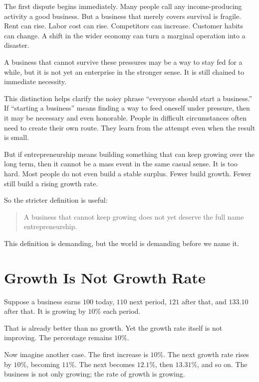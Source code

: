 The first dispute begins immediately. Many people call any income-producing activity a good business. But a business that merely covers survival is fragile. Rent can rise. Labor cost can rise. Competitors can increase. Customer habits can change. A shift in the wider economy can turn a marginal operation into a disaster.

A business that cannot survive these pressures may be a way to stay fed for a while, but it is not yet an enterprise in the stronger sense. It is still chained to immediate necessity.

This distinction helps clarify the noisy phrase ``everyone should start a business.'' If ``starting a business'' means finding a way to feed oneself under pressure, then it may be necessary and even honorable. People in difficult circumstances often need to create their own route. They learn from the attempt even when the result is small.

But if entrepreneurship means building something that can keep growing over the long term, then it cannot be a mass event in the same casual sense. It is too hard. Most people do not even build a stable surplus. Fewer build growth. Fewer still build a rising growth rate.

So the stricter definition is useful:

\begin{quote}
A business that cannot keep growing does not yet deserve the full name entrepreneurship.
\end{quote}

This definition is demanding, but the world is demanding before we name it.

\section*{Growth Is Not Growth Rate}

Suppose a business earns \(100\) today, \(110\) next period, \(121\) after that, and \(133.10\) after that. It is growing by \(10\%\) each period.

That is already better than no growth. Yet the growth rate itself is not improving. The percentage remains \(10\%\).

Now imagine another case. The first increase is \(10\%\). The next growth rate rises by \(10\%\), becoming \(11\%\). The next becomes \(12.1\%\), then \(13.31\%\), and so on. The business is not only growing; the rate of growth is growing.


